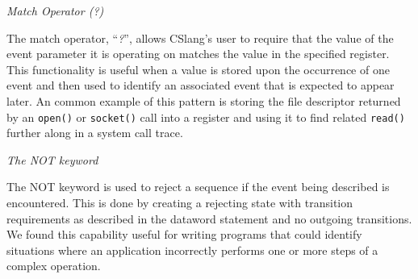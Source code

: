 \textit{Match Operator (?)}

The match operator, ``\textit{?}'', allows CSlang's user to
require that the value of the event parameter it is operating on matches
the value in the specified register.  This functionality is
useful when a value is stored upon the occurrence of one event
and then used to identify an associated event that is expected to appear later.
An common example of this pattern is storing the file descriptor
returned by an {\tt open()} or {\tt socket()} call into a register
and using it to find related {\tt read()} further along in a system call
trace.

\textit{The NOT keyword}

The NOT keyword is used to reject a sequence if the event being
described is encountered.  This is done by creating a rejecting state with
transition requirements as described in the dataword
statement and no outgoing transitions.
We found this capability useful for writing programs that could identify
situations where an application incorrectly performs one or more steps of a
complex operation.




